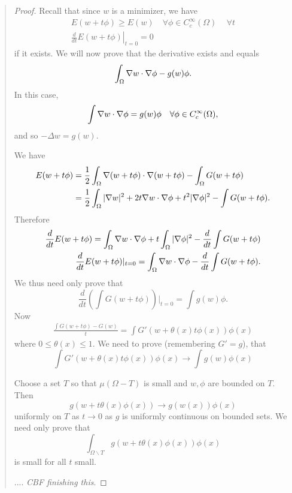 \documentclass[10pt, oneside, reqno]{amsart}
\theoremstyle{plain}%
\numberwithin{equation}{section}
\theoremstyle{definition}
\theoremstyle{remark}
\begin{document}
\begin{quote}
\begin{proof}
	Recall that since $w$ is a minimizer, we have \begin{align*}
		E(w + t \phi) \geq E(w) \quad \forall \phi \in C^\infty_c(\Omega)\, \quad \forall t \\
		\left.\frac{d}{dt} E(w + t \phi) \right|_{t = 0} = 0
	\end{align*}  if it exists.  We will now prove that the derivative exists and equals \[
		\int_\Omega \nabla w \cdot \nabla \phi - g(w) \phi. 
	\]  In this case, \[
		\int \nabla w \cdot \nabla \phi = g(w) \phi \quad \forall \phi \in C^\infty_c(\Omega),
	\] and so $-\Delta w = g(w)$.

	We have \begin{align*}
		E(w + t \phi) &= \frac{1}{2} \int_\Omega \nabla(w + t \phi) \cdot \nabla (w + t \phi) - \int_\Omega G(w + t \phi) \\
		&= \frac{1}{2} \int_\Omega |\nabla w|^2 + 2t\nabla w \cdot \nabla \phi + t^2 |\nabla \phi |^2 - \int G(w + t \phi).
	\end{align*} Therefore \begin{align*}
		\frac{d}{dt} E(w + t \phi) = \int_\Omega \nabla w \cdot \nabla \phi + t \int_\Omega |\nabla \phi|^2 - \frac{d}{dt} \int G(w + t \phi) \\
		\frac{d}{dt} E(w + t\phi) |_{t = 0} = \int_\Omega \nabla w \cdot \nabla \phi - \frac{d}{dt} \int G(w + t \phi). 
	\end{align*}  We thus need only prove that \[
		\frac{d}{dt}(\int G(w + t\phi))|_{t = 0} = \int g(w) \phi.
	\]  Now \begin{align*}
		\frac{  \int G(w + t \phi) - G(w)}{t} = \int G'(w + \theta(x) t \phi(x)) \phi(x)
	\end{align*} where $0 \leq \theta(x) \leq 1$.  We need to prove (remembering $G' = g$), that \[
		\int G'(w + \theta(x) t \phi(x)) \phi(x) \rightarrow \int g(w) \phi(x)
	\]
	
	Choose a set $T$ so that $\mu(\Omega - T)$ is small and $w, \phi$ are bounded on $T$. Then \[
		g(w + t \theta(x) \phi(x)) \rightarrow g(w(x)) \phi(x)
	\] uniformly on $T$ as $t \rightarrow 0$ as $g$ is uniformly continuous on bounded sets.  We need only prove that \[
		\int_{\Omega \backslash T} g(w + t \theta(x) \phi(x)) \phi(x)
	\] is small for all $t$ small.  
	
	.... \emph{CBF finishing this}.
	

\end{proof}
\end{quote}
\end{document}
